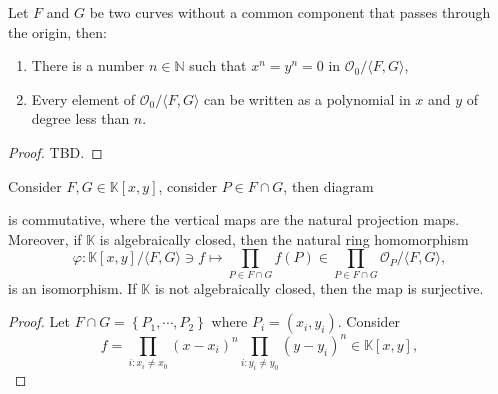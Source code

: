 \documentclass[10pt]{article}
\begin{document}
\begin{lemma}\label{lemma:finite_intersection}
  Let $F$ and $G$ be two curves without a common component that passes through the origin, then:
  \begin{enumerate}[(1)]
    \item There is a number $n \in \mathbb{N}$ such that $x^n = y^n = 0$ in $\mathcal{O}_0/\langle F,G\rangle$,
    \item Every element of $\mathcal{O}_0/\langle F,G\rangle$ can be written as a polynomial in $x$ and $y$ of degree less than $n$.
  \end{enumerate}
\end{lemma}
\begin{proof}
  TBD.
\end{proof}

\begin{lemma}
  Consider $ F, G \in \mathbb{K}[x,y]$, consider $ P \in F \cap G$, then diagram
  \begin{center}
  \end{center}
  is commutative, where the vertical maps are the natural projection maps. Moreover, if $ \mathbb{K}$ is algebraically closed, then the natural ring homomorphism
  \begin{equation*}
    \varphi : \mathbb{K}[x,y]/\langle F,G \rangle \ni f \mapsto \prod_{P \in F \cap G} f(P) \in \prod_{P \in F \cap G} \mathcal{O}_P/\langle F,G \rangle,
  \end{equation*}
  is an isomorphism. If $ \mathbb{K}$ is not algebraically closed, then the map is surjective.
\end{lemma}
\begin{proof}
  Let $ F \cap G = \left\{ P_1, \cdots ,P_2 \right\}$ where $ P_{i} = (x_{i}, y_{i})$. Consider
  \begin{equation*}
    f = \prod_{i: x_{i} \neq x_{0}} \left( x-x_{i} \right)^{n} \prod_{i:y_{i} \neq y_0} \left( y - y_{i} \right)^{n}\in \mathbb{K}[x,y],
  \end{equation*}
\end{proof}


\label{LastPage}
\end{document}

